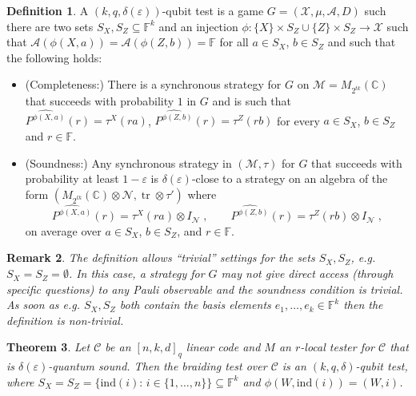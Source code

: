 \documentclass[11pt]{article}
\newtheorem{theorem}{Theorem}[section]
\newtheorem{remark}[theorem]{Remark}
\theoremstyle{definition}
\newtheorem{definition}[theorem]{Definition}
\newcommand{\code}{\mathcal{C}}
\newcommand{\Id}{\ensuremath{I}}
\newcommand{\field}{\mathbb{F}}
\newcommand{\C}{\ensuremath{\mathbb{C}}}
\newcommand{\mA}{\ensuremath{\mathcal{A}}}
\newcommand{\mM}{\ensuremath{\mathcal{M}}}
\newcommand{\mX}{\ensuremath{\mathcal{X}}}
\newcommand{\ind}{\ensuremath{\mathrm{ind}}}
\newcommand{\eps}{\varepsilon}
\newcommand{\mN}{\mathcal{N}}
\DeclareMathOperator{\tr}{tr}
\begin{document}
\begin{definition}
A $(k,q,\delta(\eps))$-qubit test is a game $G=(\mX,\mu,\mA,D)$ such there are two sets $S_X,S_Z\subseteq \field^k$ and an injection $\phi:\{X\}\times S_Z \cup \{Z\}\times S_Z \to \mX$ such that $\mA(\phi({X},a))=\mA(\phi({Z},b))=\field$ for all $a\in S_X$, $b\in S_Z$ and such that the following holds:
\begin{itemize}
\item (Completeness:) There is a synchronous strategy for $G$ on $\mM=M_{2^{tk}}(\C)$ that succeeds with probability $1$ in $G$ and is such that $\widehat{P^{\phi({X},a)}}(r) = \tau^X(ra) $, $\widehat{P^{\phi({Z},b)}}(r) = \tau^Z(rb)$ for every $a\in S_X$, $b\in S_Z$ and $r\in \field$.
\item (Soundness:) Any synchronous strategy in $(\mM,\tau)$ for $G$ that succeeds with probability at least $1-\eps$ is $\delta(\eps)$-close to a strategy on an algebra of the form $(M_{2^{tk}}(\C)\otimes \mN,\tr\otimes \tau')$ where
\[\widehat{P^{\phi({X},a)}}(r) = \tau^X(ra)\otimes \Id_\mN\;,\qquad \widehat{P^{\phi({Z},b)}}(r) = \tau^Z(rb)\otimes\Id_\mN\;,\]
on average over $a\in S_X$, $b\in S_Z$, and $r\in \field$. 
\end{itemize}
\end{definition}

\begin{remark}
The definition allows ``trivial'' settings for the sets $S_X,S_Z$, e.g.\ $S_X=S_Z=\emptyset$. In this case, a strategy for $G$ may not give direct access (through specific questions) to any Pauli observable and the soundness condition is trivial. As soon as e.g. $S_X,S_Z$ both contain the basis elements $e_1,\ldots,e_k \in \field^k$ then the definition is non-trivial. 
\end{remark}

\begin{theorem}
Let $\code$ be an $[n,k,d]_q$ linear code and $M$ an $r$-local tester for $\code$ that is $\delta(\eps)$-quantum sound. Then the braiding test over $\code$ is an $(k,q,\delta)$-qubit test, where $S_X=S_Z=\{\ind(i):\,i\in\{1,\ldots,n\}\}\subseteq \field^k$ and $\phi(W,\ind(i))=(W,i)$. 
\end{theorem}
\end{document}
